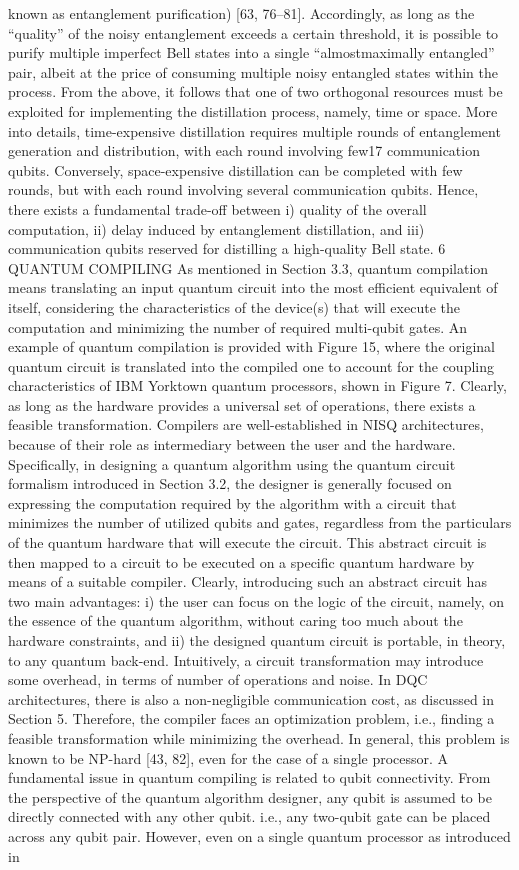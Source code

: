 known as entanglement purification) [63, 76–81]. Accordingly, as long as the “quality” of the noisy entanglement exceeds a certain threshold, it is possible to purify multiple imperfect Bell states into a single “almostmaximally entangled” pair, albeit at the price of consuming multiple noisy entangled states within the process. From the above, it follows that one of two orthogonal resources must be exploited for implementing the distillation process, namely, time or space. More into details, time-expensive distillation requires multiple rounds of entanglement generation and distribution, with each round involving few17 communication qubits. Conversely, space-expensive distillation can be completed with few rounds, but with each round involving several communication qubits. Hence, there exists a fundamental trade-off between i) quality of the overall computation, ii) delay induced by entanglement distillation, and iii) communication qubits reserved for distilling a high-quality Bell state. 6 QUANTUM COMPILING As mentioned in Section 3.3, quantum compilation means translating an input quantum circuit into the most efficient equivalent of itself, considering the characteristics of the device(s) that will execute the computation and minimizing the number of required multi-qubit gates. An example of quantum compilation is provided with Figure 15, where the original quantum circuit is translated into the compiled one to account for the coupling characteristics of IBM Yorktown quantum processors, shown in Figure 7. Clearly, as long as the hardware provides a universal set of operations, there exists a feasible transformation. Compilers are well-established in NISQ architectures, because of their role as intermediary between the user and the hardware. Specifically, in designing a quantum algorithm using the quantum circuit formalism introduced in Section 3.2, the designer is generally focused on expressing the computation required by the algorithm with a circuit that minimizes the number of utilized qubits and gates, regardless from the particulars of the quantum hardware that will execute the circuit. This abstract circuit is then mapped to a circuit to be executed on a specific quantum hardware by means of a suitable compiler. Clearly, introducing such an abstract circuit has two main advantages: i) the user can focus on the logic of the circuit, namely, on the essence of the quantum algorithm, without caring too much about the hardware constraints, and ii) the designed quantum circuit is portable, in theory, to any quantum back-end. Intuitively, a circuit transformation may introduce some overhead, in terms of number of operations and noise. In DQC architectures, there is also a non-negligible communication cost, as discussed in Section 5. Therefore, the compiler faces an optimization problem, i.e., finding a feasible transformation while minimizing the overhead. In general, this problem is known to be NP-hard [43, 82], even for the case of a single processor. A fundamental issue in quantum compiling is related to qubit connectivity. From the perspective of the quantum algorithm designer, any qubit is assumed to be directly connected with any other qubit. i.e., any two-qubit gate can be placed across any qubit pair. However, even on a single quantum processor as introduced in 